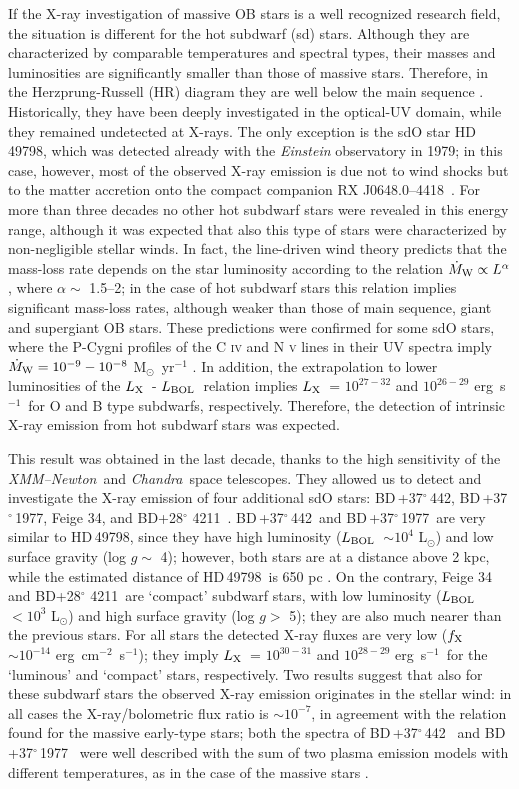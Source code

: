 \documentclass[USenglish,twocolumn]{article}
\def\XMM{{\em XMM--Newton}}
\def\Chandra{{\em Chandra}}
\def\BDone{BD\,+37$^\circ$\,442}
\def\BDtwo{BD\,+37$^\circ$\,1977}
\def\BDthree{{BD+28$^\circ$ 4211}}
\def\RX{RX J0648.0--4418}
\def\HDone{HD\,49798}
\def\mdot {\dot M}
\def\flux {\mbox{erg cm$^{-2}$ s$^{-1}$}}
\def\lum {\mbox{erg s$^{-1}$}}
\def\lx {$L_{\rm X}$}
\def\fx {$f_{\rm X}$}
\def\lbol {$L_{\rm BOL}$}
\def\msole{M$_{\odot}$}
\def\lsole{L$_{\odot}$}
\begin{document}
If the X-ray investigation of massive OB stars is a well recognized research field, the situation is different for the hot subdwarf (sd) stars. Although they are characterized by comparable temperatures and spectral types, their masses and luminosities are significantly smaller than those of massive stars. Therefore, in the Herzprung-Russell (HR) diagram they are well below the main sequence \citep{Heber16}. Historically, they have been deeply investigated in the optical-UV domain, while they remained undetected at X-rays. The only exception is the sdO star \HDone, which was detected already with the \textit{Einstein} observatory in 1979; in this case, however, most of the observed X-ray emission is due not to wind shocks but to the matter accretion onto the compact companion \RX\ \citep{Israel+97}. For more than three decades no other hot subdwarf stars were revealed in this energy range, although it was expected that also this type of stars were characterized by non-negligible stellar winds. In fact, the line-driven wind theory predicts that the mass-loss rate depends on the star luminosity according to the relation $\mdot_{\rm W} \propto L^\alpha$, where $\alpha \sim$ 1.5--2; in the case of hot subdwarf stars this relation implies significant mass-loss rates, although weaker than those of main sequence, giant and supergiant OB stars. These predictions were confirmed for some sdO stars, where the P-Cygni profiles of the C \textsc{iv} and N \textsc{v} lines in their UV spectra imply $\dot M_{\rm W} = 10^{-9} - 10^{-8}$ \msole\ yr$^{-1}$ \citep{Hamann10,JefferyHamann10}. In addition, the extrapolation to lower luminosities of the \lx\ - \lbol\ relation implies \lx\ = $10^{27-32}$ and $10^{26-29}$ \lum\ for O and B type subdwarfs, respectively. Therefore, the detection of intrinsic X-ray emission from hot subdwarf stars was expected.

This result was obtained in the last decade, thanks to the high sensitivity of the \XMM\ and \Chandra\ space telescopes. They allowed us to detect and investigate the X-ray emission of four additional sdO stars: \BDone, \BDtwo, Feige 34, and \BDthree\ \citep{MereghettiLaPalombara16}. \BDone\ and \BDtwo\ are very similar to \HDone, since they have high luminosity (\lbol\ $\sim 10^{4}$ \lsole) and low surface gravity (log $g \sim$ 4); however, both stars are at a distance above 2 kpc, while the estimated distance of \HDone\ is 650 pc \citep{KudritzkiSimon78}. On the contrary, Feige 34 and \BDthree\ are `compact' subdwarf stars, with low luminosity (\lbol\ $< 10^{3}$ \lsole) and high surface gravity (log $g >$ 5); they are also much nearer than the previous stars. For all stars the detected X-ray fluxes are very low (\fx\ $\sim 10^{-14}$ \flux); they imply \lx\ = $10^{30-31}$ and $10^{28-29}$ \lum\ for the `luminous' and `compact' stars, respectively.  Two results suggest that also for these subdwarf stars the observed X-ray emission originates in the stellar wind: in all cases the X-ray/bolometric flux ratio is $\sim 10^{-7}$, in agreement with the relation found for the massive early-type stars; both the spectra of \BDone\ \citep{Mereghetti+17} and \BDtwo\ \citep{LaPalombara+15} were well described with the sum of two plasma emission models with different temperatures, as in the case of the massive stars \citep{Naze09}.
\end{document}
